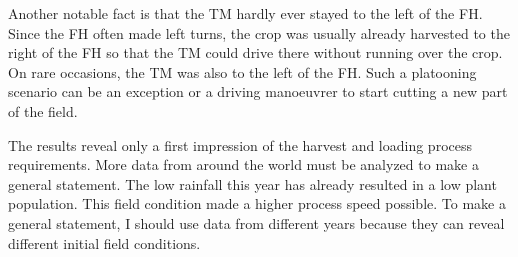 Another notable fact is that the \ac{TM} hardly ever stayed to the left of the \ac{FH}. Since the \ac{FH} often made left turns, the crop was usually already harvested to the right of the \ac{FH} so that the \ac{TM} could drive there without running over the crop. On rare occasions, the \ac{TM} was also to the left of the \ac{FH}. Such a platooning scenario can be an exception or a driving manoeuvrer to start cutting a new part of the field. 

The results reveal only a first impression of the harvest and loading process requirements. More data from around the world must be analyzed to make a general statement. The low rainfall this year has already resulted in a low plant population. This field condition made a higher process speed possible. To make a general statement, I should use data from different years because they can reveal different initial field conditions.


